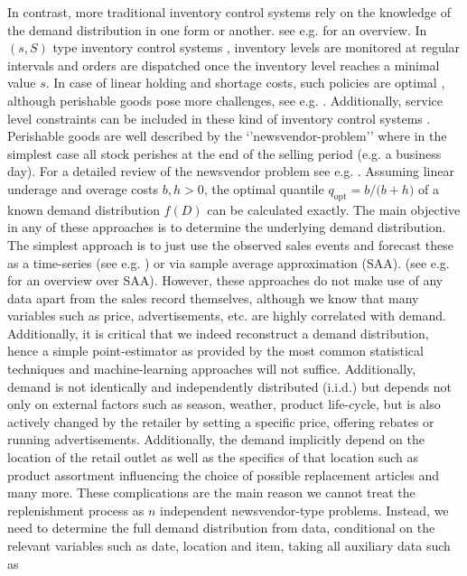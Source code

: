 \documentclass[BCOR=1mm, DIV=calc,10pt,
twoside=true,
twocolumn,
headings=normal]{scrartcl}
\begin{document}
In contrast, more traditional inventory control systems rely on the knowledge of the
demand distribution in one form or another.  see e.g. \cite{silver1998} for an overview.
In $(s,S)$ type inventory control systems \cite{Scarf1958}, inventory levels are monitored
at regular intervals and orders are dispatched once the inventory level reaches a minimal
value $s$. In case of linear holding and shortage costs, such policies are optimal
\cite{Scarf1959}, although perishable goods pose more challenges, see e.g.
\cite{Nahmias1973,Nahmias1975,nahmias1978}. Additionally, service level constraints can be
included in these kind of inventory control systems \cite{minner2010periodic}. Perishable
goods are well described by the `'newsvendor-problem'' \cite{Edgeworth} where in the
simplest case all stock perishes at the end of the selling period (e.g. a business day). 
For a detailed review of the newsvendor problem see e.g. \cite{Khouja1999537}. Assuming
linear underage and overage costs $b,h >0$, the optimal quantile
$q_{\mathrm{opt}} = {b}/{(b+h})$ of a known demand distribution $f(D)$ can be calculated
exactly. The main objective in any of these approaches is to determine the underlying
demand distribution. The simplest approach is to just use the observed sales events and
forecast these as a time-series  (see e.g. \cite{alwan2016}) or via sample average
approximation (SAA). (see e.g. \cite{shapiro2014} for an overview over SAA). However,
these approaches do not make use of any data apart from the sales record themselves,
although we know that many variables such as price, advertisements, etc. are highly
correlated with demand. Additionally, it is critical that we indeed reconstruct a demand
distribution, hence a simple point-estimator as provided by the most common statistical
techniques and machine-learning approaches will not suffice. Additionally, demand is not
identically and independently distributed (i.i.d.) but depends not only on external
factors such as season, weather, product life-cycle, but is also actively changed by the
retailer by setting a specific price, offering rebates or running advertisements.
Additionally, the demand implicitly depend on the location of the retail outlet as well as
the specifics of that location such as product  assortment influencing the choice of
possible replacement articles and many more. These complications are the main reason we
cannot treat the replenishment process as $n$ independent newsvendor-type problems.
Instead, we need to determine the full demand distribution from data, conditional on the
relevant variables such as date, location and item, taking all auxiliary data such as
\end{document}
